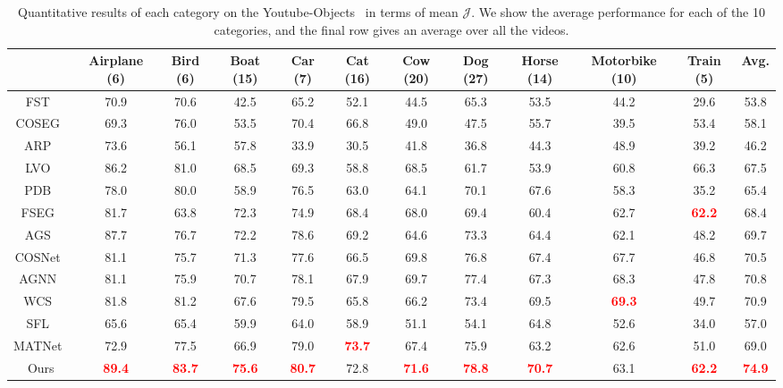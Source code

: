 \documentclass[sigconf]{acmart}
\newcommand{\textBC}[2]{\textbf{\textcolor{#1}{#2}}}
\begin{document}
\begin{table*}
\Large
	\centering
	\caption{
Quantitative results of each category on the Youtube-Objects~\cite{youtube-objects} in terms of mean $\mathcal{J}$. We show the average performance for each of the 10 categories, and the final row gives an average over all the videos.}
	\resizebox{0.9\textwidth}{!}
	{
		\setlength\tabcolsep{4pt}
		\renewcommand\arraystretch{1}
		\begin{tabular}{c||cccccccccc|c}
		 \toprule[1pt]
			& Airplane (6) & Bird (6) & Boat (15)  & Car (7) & Cat (16)& Cow (20) & Dog (27) &Horse (14)& Motorbike (10)& Train (5) & Avg. \\
\hline
			\hline
			FST~\cite{FST}& 70.9 &70.6& 42.5&65.2  &52.1&44.5&65.3 &53.5&44.2 &29.6 &53.8  \\		
			COSEG~\cite{COSEG}&69.3   &76.0 &53.5  &70.4 & 66.8& 49.0 & 47.5& 55.7& 39.5& 53.4& 58.1\\
ARP~\cite{ARP} &73.6 & 56.1&57.8 &33.9& 30.5& 41.8& 36.8 &44.3& 48.9& 39.2&46.2\\
			LVO~\cite{LVO} &86.2 &81.0&68.5 &69.3& 58.8&68.5&61.7 &53.9& 60.8& 66.3&67.5\\
PDB~\cite{PDB} &78.0  &80.0 &58.9 &76.5 &63.0&64.1&70.1 &67.6&58.3&35.2&65.4\\
			FSEG~\cite{FSEG}  &{81.7}  &63.8 &{72.3}&74.9&68.4&68.0 &69.4 & 60.4&62.7&\textBC{red}{62.2}&68.4\\


AGS~\cite{AGS} &{87.7}&76.7&72.2&78.6&69.2&64.6&73.3&64.4&62.1&48.2&69.7\\
COSNet~\cite{COSNet} &81.1&75.7&71.3&77.6&66.5&{69.8}&76.8&67.4&67.7&46.8&70.5\\
AGNN~\cite{AGNN} &81.1  &75.9 &70.7 &78.1 &67.9&69.7&{77.4} &67.3&68.3&47.8&70.8\\
WCS~\cite{WCS} &81.8  &81.2 &67.6 &79.5 &65.8&66.2&73.4 &{69.5}&\textBC{red}{69.3}&49.7&70.9\\
\hline\hline
SFL~\cite{SFL}&65.6  &65.4 &59.9&64.0 &58.9&51.1& 54.1 &64.8& 52.6& 34.0&57.0\\
MATNet~\cite{MATNet} &72.9  &77.5 &66.9 &79.0 &\textBC{red}{73.7}&67.4&75.9 &63.2&62.6&51.0&69.0\\
Ours &\textBC{red}{89.4}  &\textBC{red}{83.7} &\textBC{red}{75.6} &\textBC{red}{80.7} &72.8 &\textBC{red}{71.6} &\textBC{red}{78.8}&\textBC{red}{70.7}&{63.1}&\textBC{red}{62.2}&\textBC{red}{74.9}\\ \bottomrule[1pt]
\end{tabular}
}
\label{table:Table2}
\end{table*}
\end{document}
